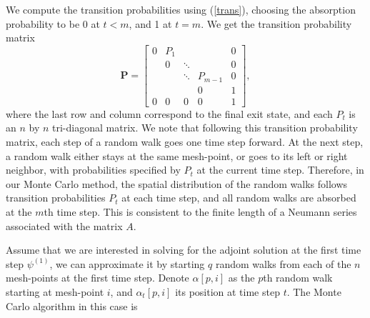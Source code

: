 \documentclass{elsart}
\theoremstyle{remark}
\theoremstyle{definition}
\theoremstyle{proof}
\begin{document}
    We compute the transition probabilities using (\ref{trans}), choosing
    the absorption probability to be 0 at $t<m$, and 1 at $t=m$.  We get the
    transition probability matrix
    \[ \mathbf{P} =
    \begin{bmatrix}
    0 & P_1 &        &         & 0 \\
      & 0   & \ddots &         & 0 \\
      &     & \ddots & P_{m-1} & 0 \\
      &     &        & 0       & 1 \\
    0 & 0   & 0      & 0       & 1
    \end{bmatrix} , \]
    where the last row and column correspond to the final exit state,
    and each $P_t$ is an $n$ by $n$ tri-diagonal matrix.  We note that
    following this transition probability matrix, each step of a random
    walk goes one time step forward.  At the next step, a random walk
    either stays at the same mesh-point, or goes to its left or right
    neighbor, with probabilities specified by $P_t$ at the current
    time step.  Therefore, in our Monte Carlo method, the spatial
    distribution of the random walks follows transition probabilities
    $P_t$ at each time step, and all random walks are absorbed at the
    $m$th time step.  This is consistent to the finite length of a
    Neumann series associated with the matrix $A$.
    
    Assume that we are interested in solving for the adjoint solution at
    the first time step $\psi^{(1)}$, we can approximate it by starting
    $q$ random walks from each of the $n$ mesh-points at the first
    time step.  Denote $\alpha[p,i]$ as the $p$th random walk starting at
    mesh-point $i$, and $\alpha_t[p,i]$ its position at time step $t$.
    The Monte Carlo algorithm in this case is
    
\end{document}
